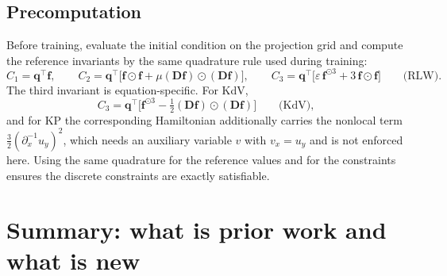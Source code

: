 \documentclass[11pt,a4paper]{article}
\theoremstyle{remark}
\begin{document}
\subsection{Precomputation}

Before training, evaluate the initial condition on the projection grid and
compute the reference invariants by the same quadrature rule used during
training:
\begin{equation}
C_1 = \bm{q}^\top\bm{f},
\qquad
C_2 = \bm{q}^\top\Big[\bm{f}\odot\bm{f} + \mu(\bm{D}\bm{f})\odot(\bm{D}\bm{f})\Big],
\qquad
C_3 = \bm{q}^\top\Big[\varepsilon\,\bm{f}^{\odot3} + 3\,\bm{f}\odot\bm{f}\Big]
\qquad\text{(RLW).}
\end{equation}
The third invariant is equation-specific. For KdV,
\begin{equation}
C_3 = \bm{q}^\top\Big[\bm{f}^{\odot3}
      - \tfrac12(\bm{D}\bm{f})\odot(\bm{D}\bm{f})\Big]
\qquad\text{(KdV)},
\end{equation}
and for KP the corresponding Hamiltonian additionally carries the nonlocal
term $\tfrac32(\partial_x^{-1}u_y)^2$, which needs an auxiliary variable
$v$ with $v_x = u_y$ and is not enforced here.
Using the same quadrature for the reference values and for the constraints
ensures the discrete constraints are exactly satisfiable.

\section{Summary: what is prior work and what is new}
\end{document}
